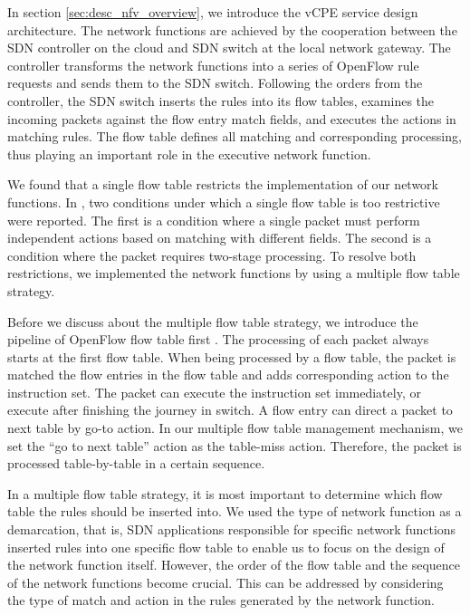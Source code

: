 In section \ref{sec:desc_nfv_overview}, we introduce the vCPE service design architecture.
The network functions are achieved by the cooperation between the SDN controller on the cloud and SDN switch at the local network gateway.
The controller transforms the network functions into a series of OpenFlow rule requests and sends them to the SDN switch.
Following the orders from the controller, the SDN switch inserts the rules into its flow tables, examines the incoming packets against the flow entry match fields, and executes the actions in matching rules.
The flow table \cite{sdn-ft} defines all matching and corresponding processing, thus playing an important role in the executive network function.

We found that a single flow table restricts the implementation of our network functions.
In \cite{multiple-flow-table}, two conditions under which a single flow table is too restrictive were reported.
The first is a condition where a single packet must perform independent actions based on matching with different fields.
The second is a condition where the packet requires two-stage processing.
To resolve both restrictions, we implemented the network functions by using a multiple flow table strategy.

Before we discuss about the multiple flow table strategy, we introduce the pipeline of OpenFlow flow table first \cite{openflow-spec}.
The processing of each packet always starts at the first flow table.
When being processed by a flow table, the packet is matched the flow entries in the flow table and adds corresponding action to the instruction set.
The packet can execute the instruction set immediately, or execute after finishing the journey in switch.
A flow entry can direct a packet to next table by go-to action.
In our multiple flow table management mechanism, we set the ``go to next table'' action as the table-miss action. Therefore, the packet is processed table-by-table in a certain sequence.

In a multiple flow table strategy, it is most important to determine which flow table the rules should be inserted into.
We used the type of network function as a demarcation, that is, SDN applications responsible for specific network functions inserted rules into one specific flow table to enable us to focus on the design of the network function itself.
However, the order of the flow table and the sequence of the network functions become crucial.
This can be addressed by considering the type of match and action in the rules generated by the network function.

